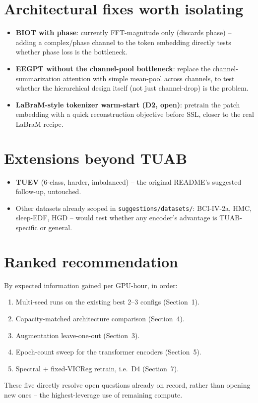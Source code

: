 \documentclass[10pt,a4paper]{article}
\begin{document}
\section{Architectural fixes worth isolating}
\begin{itemize}
  \item \textbf{BIOT with phase}: currently FFT-magnitude only (discards phase) --
  adding a complex/phase channel to the token embedding directly tests whether
  phase loss is the bottleneck.
  \item \textbf{EEGPT without the channel-pool bottleneck}: replace the
  channel-summarization attention with simple mean-pool across channels, to test
  whether the hierarchical design itself (not just channel-drop) is the problem.
  \item \textbf{LaBraM-style tokenizer warm-start (D2, open)}: pretrain the patch
  embedding with a quick reconstruction objective before SSL, closer to the real
  LaBraM recipe.
\end{itemize}

\section{Extensions beyond TUAB}
\begin{itemize}
  \item \textbf{TUEV} (6-class, harder, imbalanced) -- the original README's
  suggested follow-up, untouched.
  \item Other datasets already scoped in \texttt{suggestions/datasets/}:
  BCI-IV-2a, HMC, sleep-EDF, HGD -- would test whether any encoder's advantage is
  TUAB-specific or general.
\end{itemize}

\section{Ranked recommendation}
By expected information gained per GPU-hour, in order:
\begin{enumerate}
  \item Multi-seed runs on the existing best 2--3 configs (Section~1).
  \item Capacity-matched architecture comparison (Section~4).
  \item Augmentation leave-one-out (Section~3).
  \item Epoch-count sweep for the transformer encoders (Section~5).
  \item Spectral + fixed-VICReg retrain, i.e.\ D4 (Section~7).
\end{enumerate}
These five directly resolve open questions already on record, rather than opening
new ones -- the highest-leverage use of remaining compute.
\end{document}
